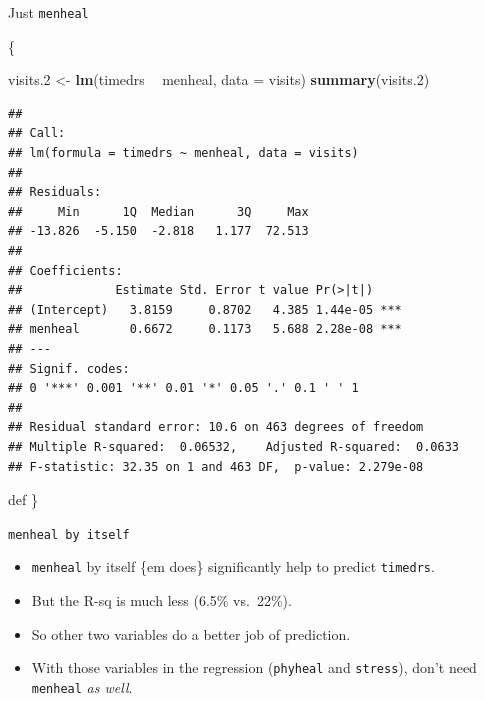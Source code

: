 \documentclass[ignorenonframetext,]{beamer}
\newenvironment{Shaded}{\begin{snugshade}}{\end{snugshade}}
\newcommand{\DataTypeTok}[1]{\textcolor[rgb]{0.13,0.29,0.53}{#1}}
\newcommand{\FloatTok}[1]{\textcolor[rgb]{0.00,0.00,0.81}{#1}}
\newcommand{\KeywordTok}[1]{\textcolor[rgb]{0.13,0.29,0.53}{\textbf{#1}}}
\newcommand{\NormalTok}[1]{#1}
\newcommand{\OperatorTok}[1]{\textcolor[rgb]{0.81,0.36,0.00}{\textbf{#1}}}
\newcommand{\StringTok}[1]{\textcolor[rgb]{0.31,0.60,0.02}{#1}}
\begin{document}
\begin{frame}[fragile]{Just \texttt{menheal}}
\protect\hypertarget{just-menheal}{}

\{\footnotesize 

\begin{Shaded}
\begin{Highlighting}[]
\NormalTok{visits}\FloatTok{.2}\NormalTok{ <-}\StringTok{ }\KeywordTok{lm}\NormalTok{(timedrs }\OperatorTok{~}\StringTok{ }\NormalTok{menheal, }\DataTypeTok{data =}\NormalTok{ visits)}
\KeywordTok{summary}\NormalTok{(visits}\FloatTok{.2}\NormalTok{)}
\end{Highlighting}
\end{Shaded}

\begin{verbatim}
## 
## Call:
## lm(formula = timedrs ~ menheal, data = visits)
## 
## Residuals:
##     Min      1Q  Median      3Q     Max 
## -13.826  -5.150  -2.818   1.177  72.513 
## 
## Coefficients:
##             Estimate Std. Error t value Pr(>|t|)    
## (Intercept)   3.8159     0.8702   4.385 1.44e-05 ***
## menheal       0.6672     0.1173   5.688 2.28e-08 ***
## ---
## Signif. codes:  
## 0 '***' 0.001 '**' 0.01 '*' 0.05 '.' 0.1 ' ' 1
## 
## Residual standard error: 10.6 on 463 degrees of freedom
## Multiple R-squared:  0.06532,    Adjusted R-squared:  0.0633 
## F-statistic: 32.35 on 1 and 463 DF,  p-value: 2.279e-08
\end{verbatim}

def \}

\end{frame}

\begin{frame}[fragile]{\texttt{menheal\ by\ itself}}
\protect\hypertarget{menheal-by-itself}{}

\begin{itemize}
\item
  \texttt{menheal} by itself \{em does\} significantly help to predict
  \texttt{timedrs}.
\item
  But the R-sq is much less (6.5\% vs.~22\%).
\item
  So other two variables do a better job of prediction.
\item
  With those variables in the regression (\texttt{phyheal} and
  \texttt{stress}), don't need \texttt{menheal} \emph{as well}.
\end{itemize}

\end{frame}
\end{document}
